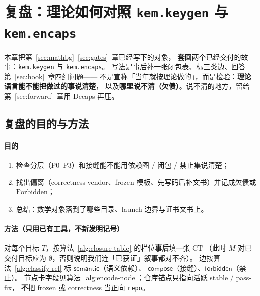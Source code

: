\documentclass[UTF8,a4paper,11pt]{ctexart}
\theoremstyle{definition}
\theoremstyle{plain}
\theoremstyle{remark}
\numberwithin{figure}{section}
\numberwithin{table}{section}
\begin{document}
\section{复盘：理论如何对照 \texttt{kem.keygen} 与 \texttt{kem.encaps}}
\label{sec:replay}

本章把第~\ref{sec:mathbg}--\ref{sec:gates}~章已经写下的对象，
\textbf{套回}两个已经交付的故事：\texttt{kem.keygen} 与 \texttt{kem.encaps}。
写法是事后补一张闭包表、标三类边、回答第~\ref{sec:hook}~章四组问题——
不是宣称「当年就按理论做的」，而是检验：\textbf{理论语言能不能把做过的事说清楚}，
以及\textbf{哪里说不清（欠债）}。说不清的地方，留给第~\ref{sec:forward}~章用 Decaps 再压。

\subsection{复盘的目的与方法}
\label{sec:replay-method}

\paragraph{目的}
\begin{enumerate}
  \item 检查分层（P0--P3）和接缝能不能用依赖图 / 闭包 / 禁止集说清楚；
  \item 找出偏离（correctness vendor、frozen 模板、先写码后补文书）并记成欠债或
        $\mathrm{Forbidden}$；
  \item 总结：数学对象落到了哪些目录、launch 边界与证书文书上。
\end{enumerate}

\paragraph{方法（只用已有工具，不新发明记号）}
对每个目标 $T$，按算法~\ref{alg:closure-table} 的栏位\textbf{事后}填一张 $\mathrm{CT}$
（此时 $M$ 对已交付目标应为 $\emptyset$，否则说明我们连「已获证」叙事都对不齐）。
边按算法~\ref{alg:classify-rel} 标 $\mathsf{semantic}$（语义依赖）、
$\mathsf{compose}$（接缝）、$\mathsf{forbidden}$（禁止）。
节点卡字段见算法~\ref{alg:encode-node}；仓库锚点只指向活跃 stable / pass-fix，
\textbf{不}把 frozen 或 correctness 当正向 \texttt{repo}。
\end{document}
